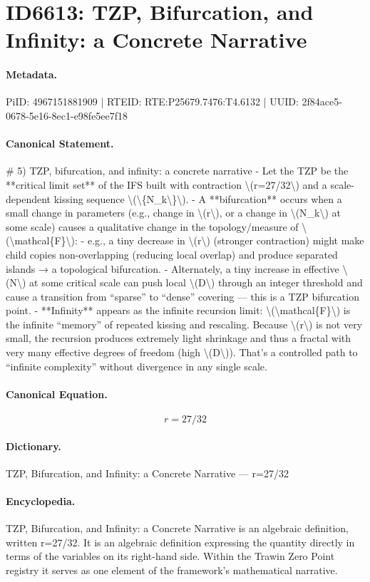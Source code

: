 \section*{ID6613: TZP, Bifurcation, and Infinity: a Concrete Narrative}
\paragraph{Metadata.}
PiID: 4967151881909 | RTEID: RTE:P25679.7476:T4.6132 | UUID: 2f84ace5-0678-5e16-8ec1-e98fe5ee7f18

\paragraph{Canonical Statement.}
\# 5) TZP, bifurcation, and infinity: a concrete narrative - Let the TZP be the **critical limit set** of the IFS built with contraction \textbackslash{}(r=27/32\textbackslash{}) and a scale-dependent kissing sequence \textbackslash{}(\textbackslash{}\{N\_k\textbackslash{}\}\textbackslash{}). - A **bifurcation** occurs when a small change in parameters (e.g., change in \textbackslash{}(r\textbackslash{}), or a change in \textbackslash{}(N\_k\textbackslash{}) at some scale) causes a qualitative change in the topology/measure of \textbackslash{}(\textbackslash{}mathcal\{F\}\textbackslash{}): - e.g., a tiny decrease in \textbackslash{}(r\textbackslash{}) (stronger contraction) might make child copies non-overlapping (reducing local overlap) and produce separated islands → a topological bifurcation. - Alternately, a tiny increase in effective \textbackslash{}(N\textbackslash{}) at some critical scale can push local \textbackslash{}(D\textbackslash{}) through an integer threshold and cause a transition from “sparse” to “dense” covering — this is a TZP bifurcation point. - **Infinity** appears as the infinite recursion limit: \textbackslash{}(\textbackslash{}mathcal\{F\}\textbackslash{}) is the infinite “memory” of repeated kissing and rescaling. Because \textbackslash{}(r\textbackslash{}) is not very small, the recursion produces extremely light shrinkage and thus a fractal with very many effective degrees of freedom (high \textbackslash{}(D\textbackslash{})). That’s a controlled path to “infinite complexity” without divergence in any single scale.

\paragraph{Canonical Equation.}
\[
r=27/32
\]

\paragraph{Dictionary.}
TZP, Bifurcation, and Infinity: a Concrete Narrative — r=27/32

\paragraph{Encyclopedia.}
TZP, Bifurcation, and Infinity: a Concrete Narrative is an algebraic definition, written r=27/32. It is an algebraic definition expressing the quantity directly in terms of the variables on its right-hand side. Within the Trawin Zero Point registry it serves as one element of the framework's mathematical narrative.
